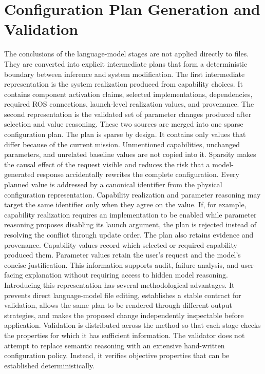\section{Configuration Plan Generation and Validation}
\label{sec:plan-validation}
The conclusions of the language-model stages are not applied directly to files. They are converted into explicit intermediate plans that form a deterministic boundary between inference and system modification.
The first intermediate representation is the system realization produced from capability choices. It contains component activation claims, selected implementations, dependencies, required ROS connections, launch-level realization values, and provenance. The second representation is the validated set of parameter changes produced after selection and value reasoning. These two sources are merged into one sparse configuration plan.
The plan is sparse by design. It contains only values that differ because of the current mission. Unmentioned capabilities, unchanged parameters, and unrelated baseline values are not copied into it. Sparsity makes the causal effect of the request visible and reduces the risk that a model-generated response accidentally rewrites the complete configuration.
Every planned value is addressed by a canonical identifier from the physical configuration representation. Capability realization and parameter reasoning may target the same identifier only when they agree on the value. If, for example, capability realization requires an implementation to be enabled while parameter reasoning proposes disabling its launch argument, the plan is rejected instead of resolving the conflict through update order.
The plan also retains evidence and provenance. Capability values record which selected or required capability produced them. Parameter values retain the user's request and the model's concise justification. This information supports audit, failure analysis, and user-facing explanation without requiring access to hidden model reasoning.
Introducing this representation has several methodological advantages. It prevents direct language-model file editing, establishes a stable contract for validation, allows the same plan to be rendered through different output strategies, and makes the proposed change independently inspectable before application.
Validation is distributed across the method so that each stage checks the properties for which it has sufficient information. The validator does not attempt to replace semantic reasoning with an extensive hand-written configuration policy. Instead, it verifies objective properties that can be established deterministically.

